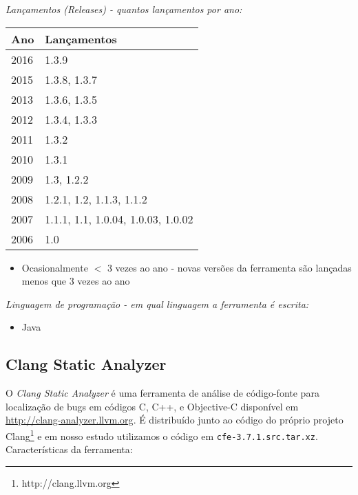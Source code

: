\begin{description}

  \item {\it Lançamentos ({\it Releases}) - quantos lançamentos por ano:}
    \begin{table}[h!]
      \centering
      \begin{tabular}{| l | l |}
        \hline
        Ano  & Lançamentos                        \\
        \hline
        2016 & 1.3.9                              \\
        2015 & 1.3.8, 1.3.7                       \\
        2013 & 1.3.6, 1.3.5                       \\
        2012 & 1.3.4, 1.3.3                       \\
        2011 & 1.3.2                              \\
        2010 & 1.3.1                              \\
        2009 & 1.3, 1.2.2                         \\
        2008 & 1.2.1, 1.2, 1.1.3, 1.1.2           \\
        2007 & 1.1.1, 1.1, 1.0.04, 1.0.03, 1.0.02 \\
        2006 & 1.0                                \\
        \hline
      \end{tabular}
    \end{table}
    \begin{itemize}
      \item Ocasionalmente $<$ 3 vezes ao ano - novas versões da ferramenta são lançadas menos que 3 vezes ao ano
    \end{itemize}

  \item {\it Linguagem de programação - em qual linguagem a ferramenta é escrita:}
    \begin{itemize}
      \item Java
    \end{itemize}

\end{description}

\subsection{Clang Static Analyzer}

O {\it Clang Static Analyzer} é uma ferramenta de análise de código-fonte para
localização de bugs em códigos C, C++, e Objective-C disponível em
\url{http://clang-analyzer.llvm.org}. É distribuído junto ao código do próprio
projeto Clang\footnote{http://clang.llvm.org} e em nosso estudo utilizamos o
código em \texttt{cfe-3.7.1.src.tar.xz}. Características da ferramenta:

